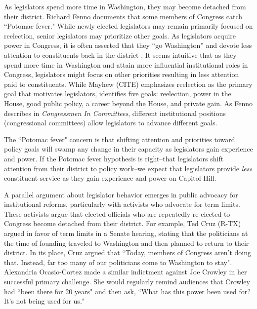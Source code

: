\documentclass[12pt]{article}
\begin{document}
As legislators spend more time in Washington, they may become detached from their district. Richard Fenno documents that some members of Congress catch ``Potomac fever." While newly elected legislators may remain primarily focused on reelection, senior legislators may prioritize other goals. As legislators acquire power in Congress, it is often asserted that they ``go Washington'' and devote less attention to constituents back in the district \citep{Fenno1978}. It seems intuitive that as they spend more time in Washington and attain more influential institutional roles in Congress, legislators might focus on other priorities resulting in less attention paid to constituents.  While Mayhew (CITE) emphasizes reelection as the primary goal that motivates legislators, \citet{Fenno1973} identifies five goals: reelection, power in the House, good public policy, a career beyond the House, and private gain. As Fenno describes in \textit{Congressmen In Committees}, different institutional positions (congressional committees) allow legislators to advance different goals. %

The ``Potomac fever" concern is that shifting attention and priorities toward policy goals will swamp any change in their capacity as legislators gain experience and power. If the Potomac fever hypothesis is right--that legislators shift attention from their district to policy work--we expect that legislators provide \textit{less} constituent service as they gain experience and power on Capitol Hill. 


A parallel argument about legislator behavior emerges in public advocacy for institutional reforms, particularly with activists who advocate for term limits. These activists argue that elected officials who are repeatedly re-elected to Congress become detached from their district. For example, Ted Cruz (R-TX) argued in favor of term limits in a Senate hearing, stating that the politicians at the time of founding traveled to Washington and then planned to return to their district. In its place, Cruz argued that ``Today, members of Congress aren't doing that. Instead, far too many of our politicians come to Washington to stay". Alexandria Ocasio-Cortez made a similar indictment against Joe Crowley in her successful primary challenge. She would regularly remind audiences that Crowley had ``been there for 20 years" and then ask, ``What has this power been used for? It's not being used for us." %
\end{document}
